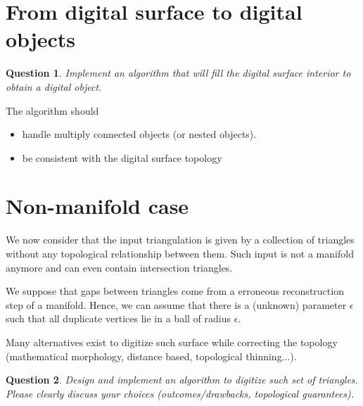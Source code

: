 \documentclass[a4paper, 11pt]{article}
\newtheorem{qu}{Question}
\begin{document}
\section{From digital surface to digital objects}

\begin{qu}
  Implement an algorithm that will fill the digital surface interior
  to obtain a digital object. 
\end{qu}

The algorithm should
\begin{itemize}
\item handle multiply connected objects (or nested objects).
\item be consistent with the digital surface topology 
\end{itemize}


\section{Non-manifold case}

We now consider that the input triangulation is given by a
collection of triangles without any topological relationship between
them. Such input is not a manifold anymore and can even contain
intersection triangles.

We suppose that gaps between triangles come from a erroneous
reconstruction step of a manifold. Hence, we can assume that there is
a (unknown) parameter $\epsilon$ such that all duplicate vertices lie
in a ball of radius $\epsilon$.

Many alternatives exist to digitize such surface while correcting the
topology (mathematical morphology, distance based, topological
thinning...).

\begin{qu}
  Design and implement an algorithm to digitize such set of
  triangles. Please clearly discuss your choices (outcomes/drawbacks,
  topological guarantees).
\end{qu}

\nocite{Cohen-Or1997,Schwarz2010,Laine2013}



\end{document}
